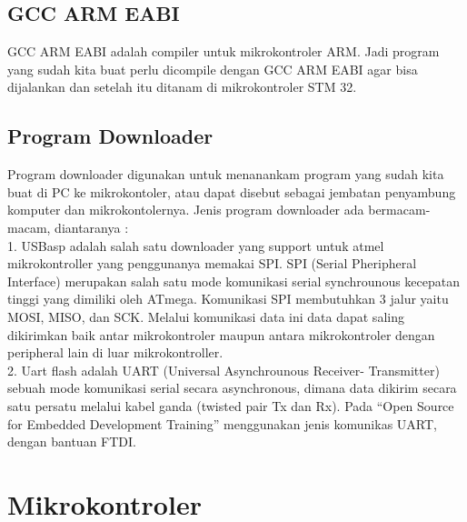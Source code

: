 \documentclass[11pt,fleqn]{book} %
\begin{document}
\section{GCC ARM EABI}
\hspace{10pt}GCC ARM EABI adalah compiler untuk mikrokontroler ARM.
 Jadi program yang sudah kita buat perlu dicompile dengan GCC ARM EABI agar bisa dijalankan dan setelah itu ditanam di mikrokontroler STM 32.
\section{Program Downloader}
\hspace{10pt} Program downloader digunakan untuk menanankam program yang sudah kita buat di PC ke mikrokontoler, atau dapat disebut sebagai jembatan penyambung komputer dan mikrokontolernya. 
Jenis program downloader ada bermacam-macam, diantaranya :\\
1. USBasp adalah salah satu downloader yang support untuk atmel mikrokontroller yang penggunanya memakai SPI.
SPI (Serial Pheripheral Interface) merupakan salah satu mode komunikasi serial synchrounous kecepatan tinggi
yang dimiliki oleh ATmega. Komunikasi SPI membutuhkan
3 jalur yaitu MOSI, MISO, dan SCK. Melalui komunikasi data ini
data dapat saling dikirimkan baik antar mikrokontroler maupun antara mikrokontroler dengan peripheral lain di luar mikrokontroller.\\
2. Uart flash adalah UART (Universal Asynchrounous Receiver- Transmitter) sebuah mode komunikasi
serial secara asynchronous, dimana data dikirim secara satu persatu melalui kabel
ganda (twisted pair Tx dan Rx). Pada ``Open Source for Embedded Development Training''
menggunakan jenis komunikas UART, dengan bantuan FTDI.
\newpage
{} %
\chapter{Mikrokontroler}
\end{document}
